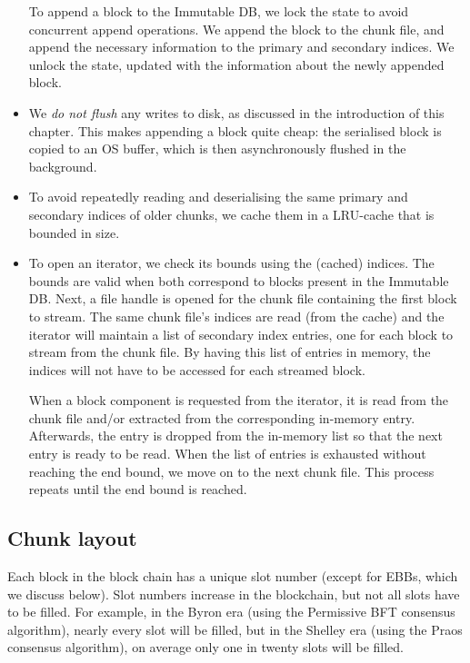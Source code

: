 \begin{itemize}
  To append a block to the Immutable DB, we lock the state to avoid concurrent
  append operations. We append the block to the chunk file, and append the
  necessary information to the primary and secondary indices. We unlock the
  state, updated with the information about the newly appended block.

\item We \emph{do not flush} any writes to disk, as discussed in the
  introduction of this chapter. This makes appending a block quite cheap: the
  serialised block is copied to an OS buffer, which is then asynchronously
  flushed in the background.

\item To avoid repeatedly reading and deserialising the same primary and
  secondary indices of older chunks, we cache them in a LRU-cache that is
  bounded in size.

\item To open an iterator, we check its bounds using the (cached) indices. The
  bounds are valid when both correspond to blocks present in the Immutable DB.
  Next, a file handle is opened for the chunk file containing the first block to
  stream. The same chunk file's indices are read (from the cache) and the
  iterator will maintain a list of secondary index entries, one for each block
  to stream from the chunk file. By having this list of entries in memory, the
  indices will not have to be accessed for each streamed block.

  When a block component is requested from the iterator, it is read from the
  chunk file and/or extracted from the corresponding in-memory entry.
  Afterwards, the entry is dropped from the in-memory list so that the next
  entry is ready to be read. When the list of entries is exhausted without
  reaching the end bound, we move on to the next chunk file. This process
  repeats until the end bound is reached.
\end{itemize}

\subsection{Chunk layout}
\label{immutable:implementation:chunk-layout}

Each block in the block chain has a unique slot number (except for EBBs, which
we discuss below). Slot numbers increase in the blockchain, but not all slots
have to be filled. For example, in the Byron era (using the Permissive BFT
consensus algorithm), nearly every slot will be filled, but in the Shelley era
(using the Praos consensus algorithm), on average only one in twenty slots will
be filled.

